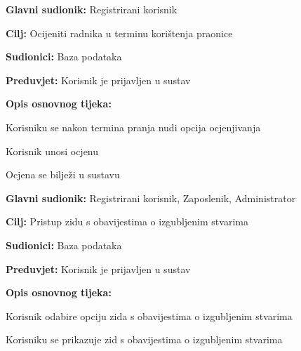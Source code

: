 \noindent {}
\begin{packed_item}
	
	\item \textbf{Glavni sudionik: }Registrirani korisnik
	\item  \textbf{Cilj:} Ocijeniti radnika u terminu korištenja praonice
	\item  \textbf{Sudionici:} Baza podataka
	\item  \textbf{Preduvjet:} Korisnik je prijavljen u sustav
	\item  \textbf{Opis osnovnog tijeka:}
	
	\item[] \begin{packed_enum}
		
		\item Korisniku se nakon termina pranja nudi opcija ocjenjivanja
		\item Korisnik unosi ocjenu
		\item Ocjena se bilježi u sustavu
	\end{packed_enum}
		
\end{packed_item}

\noindent {}
\begin{packed_item}
	
	\item \textbf{Glavni sudionik: } Registrirani korisnik, Zaposlenik, Administrator 
	\item  \textbf{Cilj:} Pristup zidu s obavijestima o izgubljenim stvarima
	\item  \textbf{Sudionici:} Baza podataka
	\item  \textbf{Preduvjet:} Korisnik je prijavljen u sustav
	\item  \textbf{Opis osnovnog tijeka:}
	
	\item[] \begin{packed_enum}
		
		\item Korisnik odabire opciju zida s obavijestima o izgubljenim stvarima
		\item Korisniku se prikazuje zid s obavijestima o izgubljenim stvarima
	\end{packed_enum}
\end{packed_item}

